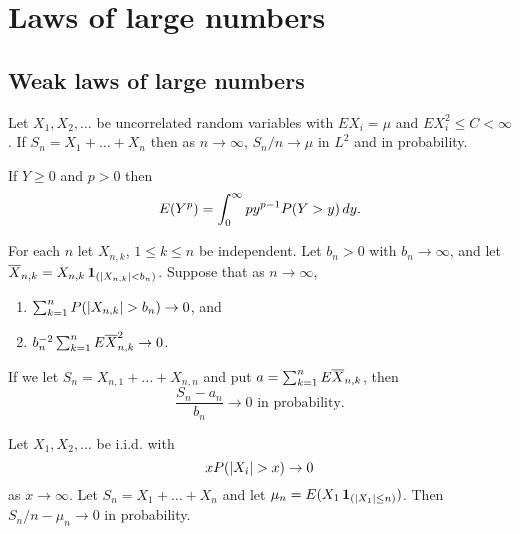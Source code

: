 \documentclass[a4paper]{article}
\begin{document}
\maketitle

\tableofcontents

\setcounter{section}{1}
\section{Laws of large numbers}

\setcounter{subsection}{1}

\subsection{Weak laws of large numbers}
\begin{thm}
Let $X_1, X_2, \dots$ be uncorrelated random variables with $EX_i = \mu$
and $E X_i^2 \leq C < \infty$. If $S_n = X_1 + \dots + X_n$ then 
as $n \to \infty$, $S_n / n \to \mu$ in $L^2$ and in probability.
\end{thm}


\begin{lemma}
  If $Y \geq 0$ and $p > 0$ then 
  \[
  E(Y^p) = \int_0^\infty p y^{p - 1} P(Y > y) \, d y.
  \]
\end{lemma}

\begin{thm}
  For each $n$ let $X_{n, k}$, $1 \leq k \leq n$ be independent. 
  Let $b_n > 0$ with $b_n \to \infty$, and let 
  $\overline{X}_{n, k} = X_{n, k} \operatorname{\mathbf{1}}_{(\left\lvert X_{n, k}\right\rvert < b_n)}$.
  Suppose that as $n \to \infty$, 
  \begin{enumerate}
    \item $\sum_{k=1}^n P(\left\lvert X_{n, k}\right\rvert > b_n) \to 0$, and
    \item $b_n^{-2} \sum_{k=1}^n E \overline{X}_{n,k}^2 \to 0$.
  \end{enumerate}
  If we let $S_n = X_{n, 1} + \dots + X_{n, n}$ and put 
  $a = \sum_{k=1}^n E \overline{X}_{n, k}$, then
  \[
  \frac{S_n - a_n}{b_n} \to 0 \text{ in probability.}
  \]
\end{thm}

\begin{thm}
  Let $X_1, X_2, \dots$ be i.i.d. with 
  \[
  x P(\left\lvert X_i\right\rvert > x) \to 0
  \]
  as $x \to \infty$. Let $S_n = X_1 + \dots + X_n$ and let 
  $\mu_n = E(X_1 \operatorname{\mathbf{1}}_{(\left\lvert X_1\right\rvert \leq n)})$. Then 
  $S_n / n - \mu_n \to 0$ in probability.
\end{thm}
\end{document}

